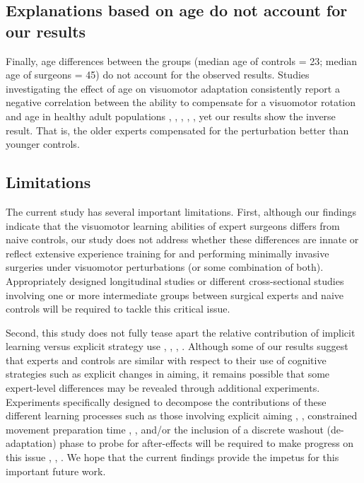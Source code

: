 \documentclass[jou, 11pt, longtable, floatsintext, notab]{apa6}
\begin{document}
\subsection{Explanations based on age do not account 
    for our results}
Finally, age differences between the groups (median age of
controls = 23; median age of surgeons = 45) do not account
for the observed results. Studies investigating the effect
of age on visuomotor adaptation consistently report a
negative correlation between the ability to compensate for a
visuomotor rotation and age in healthy adult populations
\cite{anguera_failure_2011},
\cite{seidler_differential_2006},
\cite{voelcker-rehage_motor-skill_2008},
\cite{king_neural_2013}, \cite{buch_visuomotor_2003}, yet
our results show the inverse result. That is, the older
experts compensated for the perturbation better than younger
controls.

\subsection{Limitations}
The current study has several important limitations. First,
although our findings indicate that the visuomotor learning
abilities of expert surgeons differs from naive controls,
our study does not address whether these differences are
innate or reflect extensive experience training for and
performing minimally invasive surgeries under visuomotor
perturbations (or some combination of both). Appropriately
designed longitudinal studies or different cross-sectional
studies involving one or more intermediate groups between
surgical experts and naive controls will be required to
tackle this critical issue.

Second, this study does not fully tease apart the relative
contribution of implicit learning versus explicit strategy
use \cite{smith_interacting_2006},
\cite{mcdougle_taking_2016}, \cite{mazzoni_implicit_2006},
\cite{taylor_explicit_2014}. Although some of our results
suggest that experts and controls are similar with respect
to their use of cognitive strategies such as explicit
changes in aiming, it remains possible that some
expert-level differences may be revealed through additional
experiments. Experiments specifically designed to decompose
the contributions of these different learning processes such
as those involving explicit aiming
\cite{taylor_explicit_2014}, \cite{bond_flexible_2015},
constrained movement preparation time
\cite{haith_influence_2015}, \cite{leow_estimating_2017},
and/or the inclusion of a discrete washout (de-adaptation)
phase to probe for after-effects
\cite{smith_interacting_2006} will be required to make
progress on this issue \cite{mcdougle_taking_2016},
\cite{mazzoni_implicit_2006}, \cite{taylor_explicit_2014}.
We hope that the current findings provide the impetus for
this important future work.
\end{document}
